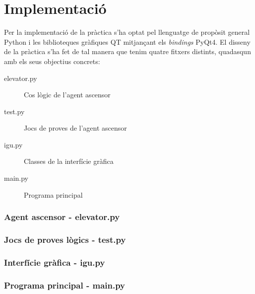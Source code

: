 
\newpage
\appendix

\section{Implementació}

Per la implementació de la pràctica s'ha optat pel llenguatge de propòsit
general Python i les biblioteques gràfiques QT mitjançant els \emph{bindings}
PyQt4. El disseny de la pràctica s'ha fet de tal manera que tenim quatre
fitxers distints, quadasqun amb els seus objectius concrets:

\begin{description}
   \item[elevator.py] Cos lògic de l'agent ascensor
   \item[test.py] Jocs de proves de l'agent ascensor
   \item[igu.py] Classes de la interfície gràfica
   \item[main.py] Programa principal
\end{description}

\newpage

\addtolength{\hoffset}{-2cm}

\subsubsection*{Agent ascensor - elevator.py}

\subsubsection*{Jocs de proves lògics - test.py}

\subsubsection*{Interfície gràfica - igu.py}

\newpage
\subsubsection*{Programa principal - main.py}

\newpage

\addtolength{\hoffset}{2cm}

